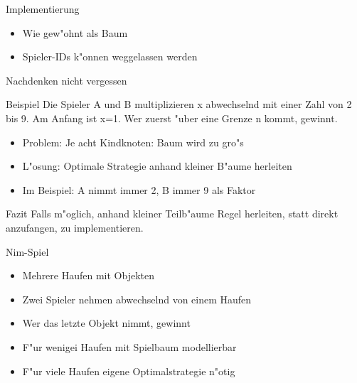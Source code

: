 \documentclass[18pt]{beamer}
\begin{document}
\begin{frame}{Implementierung}
\begin{itemize}
\item Wie gew"ohnt als Baum

\item Spieler-IDs k"onnen weggelassen werden

\end{itemize}
\end{frame}

\begin{frame}{Nachdenken nicht vergessen}
\begin{block}{Beispiel}
Die Spieler A und B multiplizieren x abwechselnd mit einer Zahl von 2 bis 9. Am Anfang ist x=1. Wer zuerst "uber eine Grenze n kommt, gewinnt.
\end{block}
\pause
\begin{itemize}
\item Problem: Je acht Kindknoten: Baum wird zu gro"s
\item L"osung: Optimale Strategie anhand kleiner B"aume herleiten
\item Im Beispiel: A nimmt immer 2, B immer 9 als Faktor
\end{itemize}
\pause
\begin{block}{Fazit}
Falls m"oglich, anhand kleiner Teilb"aume Regel herleiten, statt direkt anzufangen, zu implementieren.
\end{block}
\end{frame}

\begin{frame}{Nim-Spiel}
\begin{itemize}
\item Mehrere Haufen mit Objekten
\item Zwei Spieler nehmen abwechselnd von einem Haufen
\item Wer das letzte Objekt nimmt, gewinnt
\item F"ur wenigei Haufen mit Spielbaum modellierbar
\item F"ur viele Haufen eigene Optimalstrategie n"otig
\end{itemize}
\end{frame}
\end{document}
